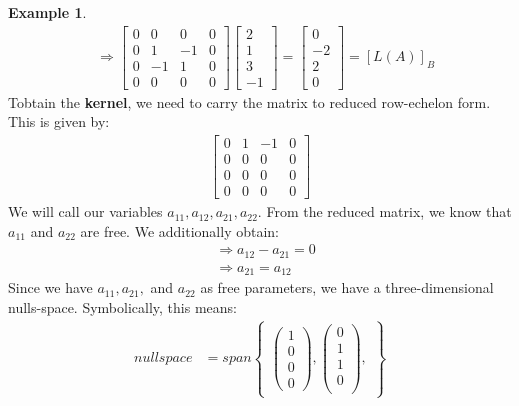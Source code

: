 \documentclass[a4paper, 12pt]{article}
\theoremstyle{definition}
\newtheorem{exmp}{Example}[section]
\theoremstyle{definition}
\theoremstyle{definition}
\theoremstyle{definition}
\begin{document}
{\begin{exmp}
\begin{align*}
		& \Rightarrow \begin{bmatrix}
			0 & 0 & 0 & 0 \\
			0 & 1 & -1 & 0 \\
			0 & -1 & 1 & 0 \\
			0 & 0 & 0 & 0 
		\end{bmatrix} \begin{bmatrix}
			2 \\
			1 \\
			3 \\
			-1 
		\end{bmatrix} = \begin{bmatrix}
			0 \\
			-2 \\
			2 \\
			0 
		\end{bmatrix} = [L(A)]_B
	\end{align*}
	Tobtain the \textbf{kernel}, we need to carry the matrix to reduced row-echelon form. This is given by: 
\begin{align*} 
	\begin{bmatrix}
		0 & 1 & -1& 0 \\
		0 & 0 & 0 & 0 \\
		0 & 0 & 0 & 0 \\
		0 & 0 & 0 & 0 
	\end{bmatrix}
\end{align*}
We will call our variables $a_{11}, a_{12}, a_{21}, a_{22}$. From the reduced matrix, we know that $a_{11}$ and $a_{22}$ are free. We additionally obtain: 
\begin{align*}
	& \Rightarrow a_{12} - a_{21} = 0 \\
	& \Rightarrow a_{21} = a_{12} 
\end{align*}
Since we have $a_{11}, a_{21},$ and $a_{22}$ as free parameters, we have a three-dimensional nulls-space. Symbolically, this means: 
\begin{align*}
	nullspace  & = span\begin{Bmatrix}
		\begin{pmatrix}
			1 \\
			0 \\
			0 \\
			0 
		\end{pmatrix}, 
		\begin{pmatrix}
			0 \\
			1 \\
			1 \\
			0 \\
		\end{pmatrix}, 

\end{Bmatrix}
\end{align*}
\end{exmp}}
\end{document}
